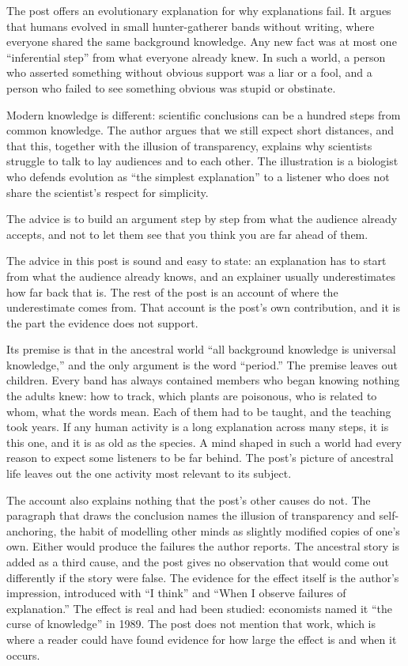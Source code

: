 \begin{afterword}
\summaryhead

The post offers an evolutionary explanation for why explanations fail. It argues that humans evolved in small hunter-gatherer bands without writing, where everyone shared the same background knowledge. Any new fact was at most one ``inferential step'' from what everyone already knew. In such a world, a person who asserted something without obvious support was a liar or a fool, and a person who failed to see something obvious was stupid or obstinate.

Modern knowledge is different: scientific conclusions can be a hundred steps from common knowledge. The author argues that we still expect short distances, and that this, together with the illusion of transparency, explains why scientists struggle to talk to lay audiences and to each other. The illustration is a biologist who defends evolution as ``the simplest explanation'' to a listener who does not share the scientist's respect for simplicity.

The advice is to build an argument step by step from what the audience already accepts, and not to let them see that you think you are far ahead of them.

\responsehead

The advice in this post is sound and easy to state: an explanation has to start from what the audience already knows, and an explainer usually underestimates how far back that is. The rest of the post is an account of where the underestimate comes from. That account is the post's own contribution, and it is the part the evidence does not support.

Its premise is that in the ancestral world ``all background knowledge is universal knowledge,'' and the only argument is the word ``period.'' The premise leaves out children. Every band has always contained members who began knowing nothing the adults knew: how to track, which plants are poisonous, who is related to whom, what the words mean. Each of them had to be taught, and the teaching took years. If any human activity is a long explanation across many steps, it is this one, and it is as old as the species. A mind shaped in such a world had every reason to expect some listeners to be far behind. The post's picture of ancestral life leaves out the one activity most relevant to its subject.

The account also explains nothing that the post's other causes do not. The paragraph that draws the conclusion names the illusion of transparency and self-anchoring, the habit of modelling other minds as slightly modified copies of one's own. Either would produce the failures the author reports. The ancestral story is added as a third cause, and the post gives no observation that would come out differently if the story were false. The evidence for the effect itself is the author's impression, introduced with ``I think'' and ``When I observe failures of explanation.'' The effect is real and had been studied: economists named it ``the curse of knowledge'' in 1989. The post does not mention that work, which is where a reader could have found evidence for how large the effect is and when it occurs.


\end{afterword}
